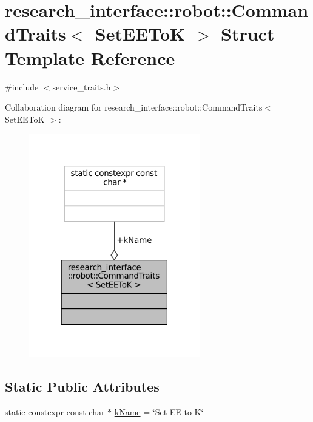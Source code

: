 \hypertarget{structresearch__interface_1_1robot_1_1CommandTraits_3_01SetEEToK_01_4}{}\section{research\+\_\+interface\+:\+:robot\+:\+:Command\+Traits$<$ Set\+E\+E\+ToK $>$ Struct Template Reference}
\label{structresearch__interface_1_1robot_1_1CommandTraits_3_01SetEEToK_01_4}


{\ttfamily \#include $<$service\+\_\+traits.\+h$>$}



Collaboration diagram for research\+\_\+interface\+:\+:robot\+:\+:Command\+Traits$<$ Set\+E\+E\+ToK $>$\+:
\nopagebreak
\begin{figure}[H]
\begin{center}
\leavevmode
\includegraphics[width=211pt]{structresearch__interface_1_1robot_1_1CommandTraits_3_01SetEEToK_01_4__coll__graph}
\end{center}
\end{figure}
\subsection*{Static Public Attributes}
\begin{DoxyCompactItemize}
\item 
static constexpr const char $\ast$ \hyperlink{structresearch__interface_1_1robot_1_1CommandTraits_3_01SetEEToK_01_4_a69b5a57cf82827f7f1ce0f0022aaed28}{k\+Name} = \char`\"{}Set EE to K\char`\"{}
\end{DoxyCompactItemize}


